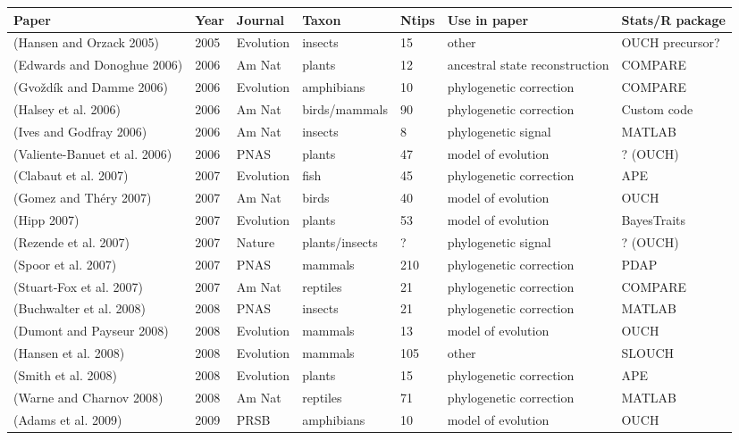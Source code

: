 \begin{longtable}{p{6cm}llllll}
\hline

\textbf{Paper}	&	Year	&	Journal	&	Taxon	&	Ntips	&	Use in paper	&	Stats/R package	\\
\hline
(Hansen and Orzack 2005)	&	2005	&	Evolution	&	insects	&	15	&	other	&	OUCH precursor?	\\
(Edwards and Donoghue 2006) 	&	2006	&	Am Nat	&	plants	&	12	&	ancestral state reconstruction	&	COMPARE	\\
(Gvoždík and Damme 2006)	&	2006	&	Evolution	&	amphibians	&	10	&	phylogenetic correction	&	COMPARE	\\
(Halsey et al. 2006)	&	2006	&	Am Nat	&	birds/mammals	&	90	&	phylogenetic correction	&	Custom code	\\
(Ives and Godfray 2006)	&	2006	&	Am Nat	&	insects	&	8	&	phylogenetic signal	&	MATLAB	\\
(Valiente-Banuet et al. 2006)	&	2006	&	PNAS	&	plants	&	47	&	model of evolution	&	? (OUCH)	\\
(Clabaut et al. 2007)	&	2007	&	Evolution	&	fish	&	45	&	phylogenetic correction	&	APE	\\
(Gomez and Théry 2007)	&	2007	&	Am Nat	&	birds	&	40	&	model of evolution	&	OUCH	\\
(Hipp 2007)	&	2007	&	Evolution	&	plants	&	53	&	model of evolution	&	BayesTraits	\\
(Rezende et al. 2007)	&	2007	&	Nature	&	plants/insects	&	?	&	phylogenetic signal	&	? (OUCH)	\\
(Spoor et al. 2007)	&	2007	&	PNAS	&	mammals	&	210	&	phylogenetic correction	&	PDAP	\\
(Stuart‐Fox et al. 2007)	&	2007	&	Am Nat	&	reptiles	&	21	&	phylogenetic correction	&	COMPARE	\\
(Buchwalter et al. 2008)	&	2008	&	PNAS	&	insects	&	21	&	phylogenetic correction	&	MATLAB	\\
(Dumont and Payseur 2008)	&	2008	&	Evolution	&	mammals	&	13	&	model of evolution	&	OUCH	\\
(Hansen et al. 2008)	&	2008	&	Evolution	&	mammals	&	105	&	other	&	SLOUCH	\\
(Smith et al. 2008)	&	2008	&	Evolution	&	plants	&	15	&	phylogenetic correction	&	APE	\\
(Warne and Charnov 2008)	&	2008	&	Am Nat	&	reptiles	&	71	&	phylogenetic correction	&	MATLAB	\\
(Adams et al. 2009)	&	2009	&	PRSB	&	amphibians	&	10	&	model of evolution	&	OUCH	\\

\end{longtable}
